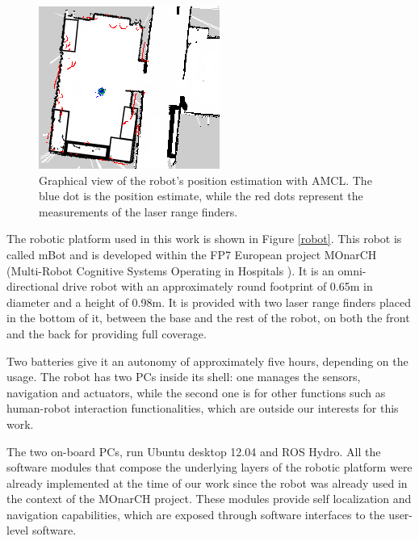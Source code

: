 
\begin{figure}
    \centering
    \includegraphics[scale=0.64]{pictures/amcl.png}
    \caption{Graphical view of the robot's position estimation with AMCL. The blue dot is the position estimate, while the red dots represent the measurements of the laser range finders.}
     \label{amcl}
\end{figure}


The robotic platform used in this work is shown in Figure \ref{robot}. This robot is called mBot \cite{Messias2014robotic} and is developed within the FP7 European project MOnarCH (Multi-Robot Cognitive Systems Operating in Hospitals \cite{monarch2013}).
It is an omni-directional drive robot with an approximately round footprint of 0.65m in diameter and a height of 0.98m.
It is provided with two laser range finders placed in the bottom of it, between the base and the rest of the robot, on both the front and the back for providing full coverage.

Two batteries give it an autonomy of approximately five hours, depending on the usage.
The robot has two PCs inside its shell: one manages the sensors, navigation and actuators, while the second one is for other functions such as human-robot interaction functionalities, which are outside our interests for this work.

The two on-board PCs, run Ubuntu desktop 12.04 and ROS Hydro. All the software modules that compose the underlying layers of the robotic platform were already implemented at the time of our work since the robot was already used in the context of the MOnarCH  project. These modules provide self localization and navigation capabilities, which are exposed through software interfaces to the user-level software.

